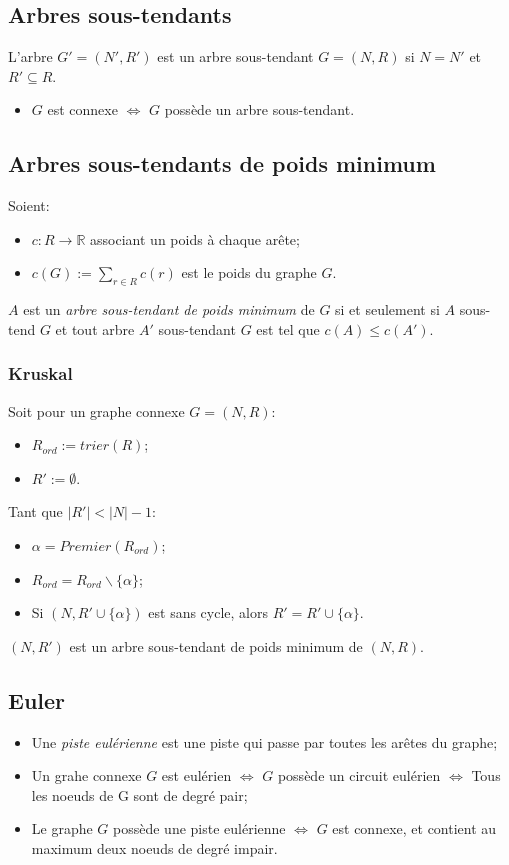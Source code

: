 \subsection{Arbres sous-tendants}
L'arbre $G' = (N', R')$ est un arbre sous-tendant
$G = (N,R)$ si $N = N'$ et $R' \subseteq R$.

\begin{itemize}
  \item $G$ est connexe $\Leftrightarrow$ $G$ possède un arbre sous-tendant.
\end{itemize}

\subsection{Arbres sous-tendants de poids minimum}
Soient:
\begin{itemize}
  \item $c : R \rightarrow \mathbb{R}$ associant un poids à chaque arête;
  \item $c(G) := \sum_{r \in R}c(r)$ est le poids du graphe $G$.
\end{itemize}
$A$ est un \emph{arbre sous-tendant de poids minimum} de $G$
si et seulement si $A$ sous-tend $G$ et tout arbre
$A'$ sous-tendant $G$ est tel que $c(A) \leq c(A')$.

\subsubsection*{Kruskal}
Soit pour un graphe connexe $G = (N,R)$:
\begin{itemize}
  \item $R_{ord} := trier(R)$;
  \item $R' := \emptyset$.
\end{itemize}
Tant que $|R'| < |N| - 1$:
\begin{itemize}
  \item $\alpha = Premier(R_{ord})$;
  \item $R_{ord} = R_{ord}\backslash\{\alpha\}$;
  \item Si $(N, R' \cup \{\alpha\})$ est sans cycle,
    alors $R' = R' \cup \{\alpha\}$.
\end{itemize}
$(N, R')$ est un arbre sous-tendant de poids minimum de $(N, R)$.

\subsection{Euler}
\begin{itemize}
  \item Une \emph{piste eulérienne} est une piste
    qui passe par toutes les arêtes du graphe;
  \item Un grahe connexe $G$ est eulérien $\Leftrightarrow$ $G$ possède un
    circuit eulérien $\Leftrightarrow$ Tous les noeuds de G sont de degré pair;
  \item Le graphe $G$ possède une piste eulérienne $\Leftrightarrow$ $G$ est
    connexe, et contient au maximum deux noeuds de degré impair.
\end{itemize}

